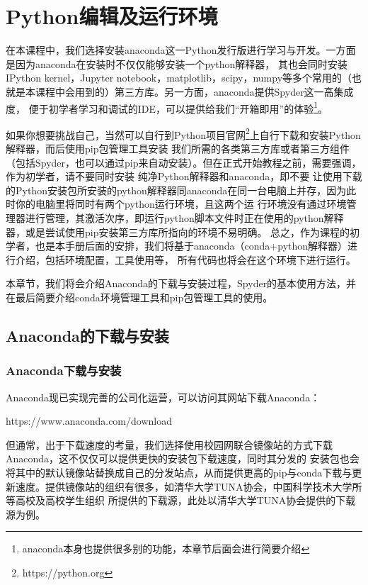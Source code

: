 \chapter{Python编辑及运行环境}
在本课程中，我们选择安装anaconda这一Python发行版进行学习与开发。一方面是因为anaconda在安装时不仅仅能够安装一个python解释器，
其也会同时安装IPython kernel，Jupyter notebook，matplotlib，scipy，numpy等多个常用的（也就是本课程中会用到的）第三方库。另一方面，anaconda提供Spyder这一高集成度，
便于初学者学习和调试的IDE，可以提供给我们“开箱即用”的体验\footnote{anaconda本身也提供很多别的功能，本章节后面会进行简要介绍}。

如果你想要挑战自己，当然可以自行到Python项目官网\footnote{https://python.org}上自行下载和安装Python解释器，而后使用pip包管理工具安装
我们所需的各类第三方库或者第三方组件（包括Spyder，也可以通过pip来自动安装）。但在正式开始教程之前，需要强调，作为初学者，请不要同时安装
纯净Python解释器和anaconda，即不要
让使用下载的Python安装包所安装的python解释器同anaconda在同一台电脑上并存，因为此时你的电脑里将同时有两个python运行环境，且这两个运
行环境没有通过环境管理器进行管理，其激活次序，即运行python脚本文件时正在使用的python解释器，或是尝试使用pip安装第三方库所指向的环境不易明确。
总之，作为课程的初学者，也是本手册后面的安排，我们将基于anaconda（conda+python解释器）进行介绍，包括环境配置，工具使用等，
所有代码也将会在这个环境下进行运行。

本章节，我们将会介绍Anaconda的下载与安装过程，Spyder的基本使用方法，并在最后简要介绍conda环境管理工具和pip包管理工具的使用。
\section{Anaconda的下载与安装}
\subsection{Anaconda下载与安装}
Anaconda现已实现完善的公司化运营，可以访问其网站下载Anaconda：

https://www.anaconda.com/download

但通常，出于下载速度的考量，我们选择使用校园网联合镜像站的方式下载Anaconda，这不仅仅可以提供更快的安装包下载速度，同时其分发的
安装包也会将其中的默认镜像站替换成自己的分发站点，从而提供更高的pip与conda下载与更新速度。提供镜像站的组织有很多，如清华大学TUNA协会，中国科学技术大学所等高校及高校学生组织
所提供的下载源，此处以清华大学TUNA协会提供的下载源为例。

